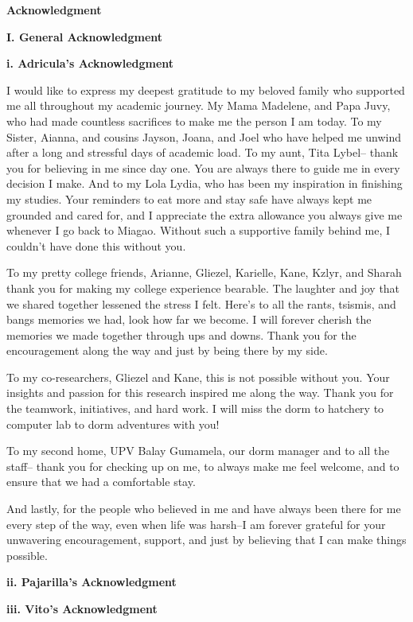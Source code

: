 \begin{center}
	\textbf{Acknowledgment}
\end{center}


\textbf{I. General Acknowledgment}

\vspace{0.5em}
\textbf{i. Adricula's Acknowledgment}

\hspace{1em} I would like to express my deepest gratitude to my beloved family who supported me all throughout my academic journey. My Mama Madelene, and Papa Juvy, who had made countless sacrifices to make me the person I am today. To my Sister, Aianna, and cousins Jayson, Joana, and Joel who have helped me unwind after a long and stressful days of academic load. To my aunt, Tita Lybel– thank you for believing in me since day one. You are always there to guide me in every decision I make.  And to my Lola Lydia, who has been my inspiration in finishing my studies. Your reminders to eat more and stay safe have always kept me grounded and cared for, and I appreciate the extra allowance you always give me whenever I go back to Miagao. Without such a supportive family behind me, I couldn’t have done this without you.

To my pretty college friends, Arianne, Gliezel, Karielle, Kane, Kzlyr, and Sharah thank you for making my college experience bearable. The laughter and joy that we shared together lessened the stress I felt. Here’s to all the rants, tsismis, and bangs memories we had, look how far we become. I will forever cherish the memories we made together through ups and downs. Thank you for the encouragement along the way and just by being there by my side. 

To my co-researchers, Gliezel and Kane, this is not possible without you. Your insights and passion for this research inspired me along the way. Thank you for the teamwork, initiatives, and hard work. I will miss the dorm to hatchery to computer lab to dorm adventures with you! 

To my second home, UPV Balay Gumamela, our dorm manager and to all the staff– thank you for checking up on me, to always make me feel welcome, and to ensure that we had a comfortable stay. 

And lastly, for the people who believed in me and have always been there for me every step of the way, even when life was harsh–I am forever grateful for your unwavering encouragement, support, and just by believing that I can make things possible. 


\vspace{1em}

\textbf{ii. Pajarilla's Acknowledgment}

\hspace{2em}

\textbf{iii. Vito's Acknowledgment}

\hspace{2em}